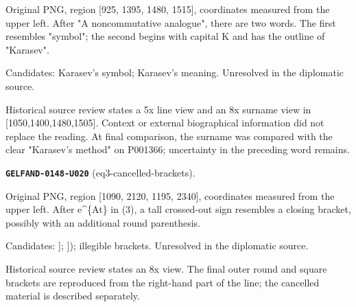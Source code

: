 \documentclass[11pt]{article}
\theoremstyle{definition}
\theoremstyle{remark}
\begin{document}
Original PNG, region [925, 1395, 1480, 1515], coordinates measured from the upper left. After "A noncommutative analogue", there are two words. The first resembles "symbol"; the second begins with capital K and has the outline of "Karasev".\par
Candidates: Karasev's symbol; Karasev's meaning. Unresolved in the diplomatic source.\par
Historical source review states a 5x line view and an 8x surname view in [1050,1400,1480,1505]. Context or external biographical information did not replace the reading. At final comparison, the surname was compared with the clear "Karasev's method" on P001366; uncertainty in the preceding word remains.\par\medskip
\noindent\leavevmode{}\label{GELFAND-P001363:eq3-cancelled-brackets:note}\textbf{\texttt{GELFAND-0148-U020}} (eq3-cancelled-brackets).\par\nopagebreak[4]
Original PNG, region [1090, 2120, 1195, 2340], coordinates measured from the upper left. After e\textasciicircum{}\{At\} in (3), a tall crossed-out sign resembles a closing bracket, possibly with an additional round parenthesis.\par
Candidates: ]; ]); illegible brackets. Unresolved in the diplomatic source.\par
Historical source review states an 8x view. The final outer round and square brackets are reproduced from the right-hand part of the line; the cancelled material is described separately.\par\medskip
\end{document}
